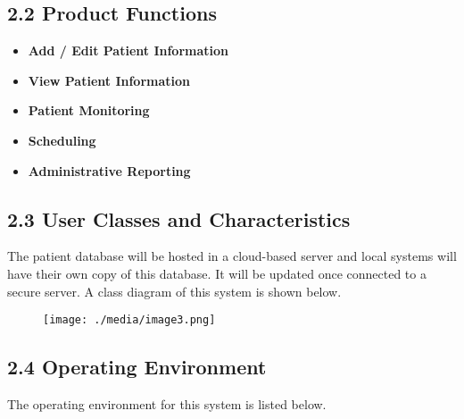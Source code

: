 \documentclass[12pt]{article}
\renewcommand{\_}{\kern-1.5pt\textunderscore\kern-1.5pt}
\begin{document}
\subsection*{2.2 \hspace*{10pt}Product Functions}
\begin{itemize}
	\item \textbf{Add / Edit Patient Information}\par

	\item \textbf{View Patient Information}\par

	\item \textbf{Patient Monitoring}\par

	\item \textbf{Scheduling}\par

	\item \textbf{Administrative Reporting}
\end{itemize}\par

\subsection*{2.3 \hspace*{10pt}User Classes and Characteristics}
The patient database will be hosted in a cloud-based server and local systems will have their own copy of this database. It will be updated once connected to a secure server. A class diagram of this system is shown below.\par





\begin{figure}[H]
	\begin{Center}
		\texttt{[image: ./media/image3.png]}
	\end{Center}
\end{figure}




\par

\subsection*{2.4 \hspace*{10pt}Operating Environment}
The operating environment for this system is listed below.\par
\end{document}
